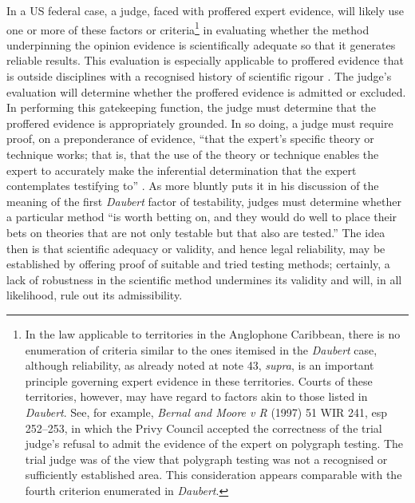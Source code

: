 \documentclass[output=paper,colorlinks,citecolor=brown]{langscibook}
\begin{document}
In a US federal case, a judge, faced with proffered expert evidence, will likely use one or more of these factors or criteria\footnote{In the law applicable to territories in the Anglophone Caribbean, there is no enumeration of criteria similar to the ones itemised in the \emph{Daubert} case, although reliability, as already noted at note 43, \emph{supra}, is an important principle governing expert evidence in these territories.  Courts of these territories, however, may have regard to factors akin to those listed in \emph{Daubert}. See, for example, \emph{Bernal and Moore v R} (1997) 51 WIR 241, esp 252--253, in which the Privy Council accepted the correctness of the trial judge’s refusal to admit the evidence of the expert on polygraph testing. The trial judge was of the view that polygraph testing was not a recognised or sufficiently established area. This consideration appears comparable with the fourth criterion enumerated in \emph{Daubert}.} in evaluating whether the method underpinning the opinion evidence is scientifically adequate so that it generates reliable results. This evaluation is especially applicable to proffered evidence that is outside disciplines with a recognised history of scientific rigour \citep{Durston2005}. The judge’s evaluation will determine whether the proffered evidence is admitted or excluded. In performing this gatekeeping function, the judge must determine that the proffered evidence is appropriately grounded. In so doing, a judge must require proof, on a preponderance of evidence, “that the expert’s specific theory or technique works; that is, that the use of the theory or technique enables the expert to accurately make the inferential determination that the expert contemplates testifying to” \citep[759]{Imwinkelried2003}. As \citet[480]{Kaye2005} more bluntly puts it in his discussion of the meaning of the first \emph{Daubert} factor of testability, judges must determine whether a particular method “is worth betting on, and they would do well to place their bets on theories that are not only testable but that also are tested.” The idea then is that scientific adequacy or validity, and hence legal reliability, may be established by offering proof of suitable and tried testing methods; certainly, a lack of robustness in the scientific method undermines its validity and will, in all likelihood, rule out its admissibility.  
\end{document}
